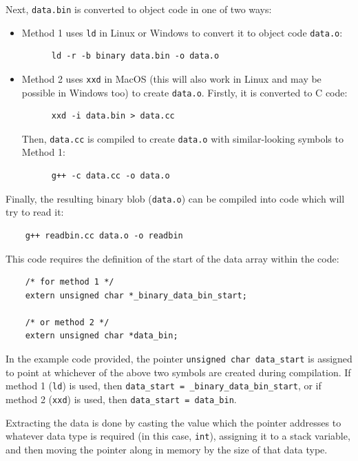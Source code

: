 	Next, \texttt{data.bin} is converted to object code in one of two ways:
	
	\begin{itemize}
	  \item Method 1 uses \texttt{ld} in Linux or Windows to convert it to object code \texttt{data.o}:
	  \begin{verbatim}
	  ld -r -b binary data.bin -o data.o
	  \end{verbatim}
	  
	  \item Method 2 uses \texttt{xxd} in MacOS (this will also work in Linux and may be possible in Windows too) to create \texttt{data.o}. Firstly, it is converted to C code:
	  \begin{verbatim}
	  xxd -i data.bin > data.cc
	  \end{verbatim}
	  
	  Then, \texttt{data.cc} is compiled to create \texttt{data.o} with similar-looking symbols to Method 1:
	  \begin{verbatim}
	  g++ -c data.cc -o data.o
	  \end{verbatim}
	\end{itemize}
	
	Finally, the resulting binary blob (\texttt{data.o}) can be compiled into code which will try to read it:
	\begin{verbatim}
	g++ readbin.cc data.o -o readbin
	\end{verbatim}
	
	This code requires the definition of the start of the data array within the code:
	\begin{verbatim}
	/* for method 1 */
	extern unsigned char *_binary_data_bin_start;
	
	/* or method 2 */
	extern unsigned char *data_bin;
	\end{verbatim}
	
	In the example code provided, the pointer \texttt{unsigned char data_start} is assigned to point at whichever of the above two symbols are created during compilation. If method 1 (\texttt{ld}) is used, then \texttt{data_start = \_binary\_data\_bin\_start}, or if method 2 (\texttt{xxd}) is used, then \texttt{data_start = data\_bin}.
	
	Extracting the data is done by casting the value which the pointer addresses to whatever data type is required (in this case, \texttt{int}), assigning it to a stack variable, and then moving the pointer along in memory by the size of that data type.
	
